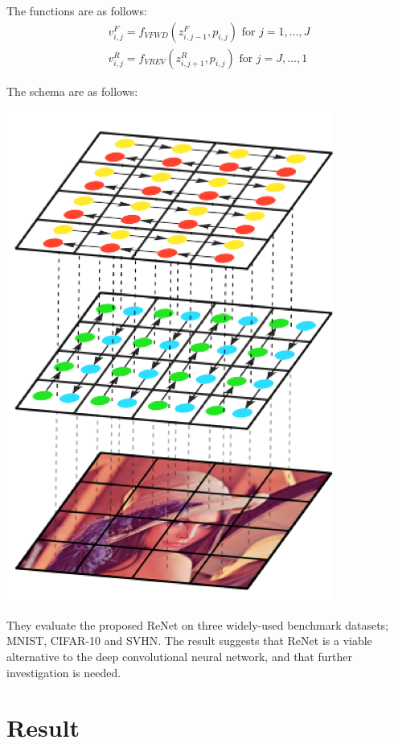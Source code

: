\documentclass[final,leqno]{siamltex}
\begin{document}
The functions are as follows:
\begin{eqnarray}
	v_{i,j}^F = f_{VFWD}(z_{i,j-1}^F, p_{i,j}) \text{~for } j=1,\dots,J \nonumber \\
	v_{i,j}^R = f_{VREV}(z_{i,j+1}^R, p_{i,j}) \text{~for } j=J,\dots,1 \nonumber
\end{eqnarray}

The schema are as follows:\\
\begin{center}
\includegraphics[scale=0.45]{Figures/Picture1}
\end{center}

They evaluate the proposed ReNet on three widely-used benchmark datasets; MNIST, CIFAR-10 and SVHN. The result suggests that ReNet is a viable alternative to the deep convolutional neural network, and that further investigation is needed.


\section{Result} \label{result}
\end{document}
